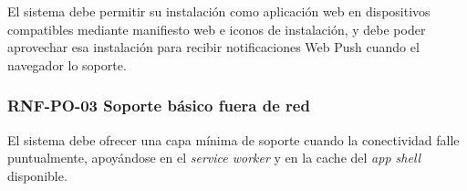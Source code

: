 El sistema debe permitir su instalación como aplicación web en dispositivos compatibles mediante manifiesto web e iconos de instalación, y debe poder aprovechar esa instalación para recibir notificaciones Web Push cuando el navegador lo soporte.

\vspace{-0.75em}
\subsubsection{RNF-PO-03 Soporte básico fuera de red}
\vspace{-1em}

El sistema debe ofrecer una capa mínima de soporte cuando la conectividad falle puntualmente, apoyándose en el \textit{service worker} y en la cache del \textit{app shell} disponible.

